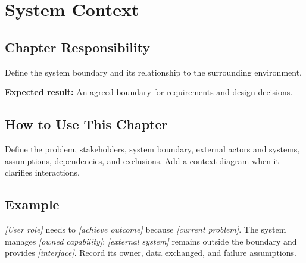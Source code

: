 \chapter{System Context}
\section{Chapter Responsibility}
\label{Section:SystemContextResponsibility}
Define the system boundary and its relationship to the surrounding environment.

\noindent\textbf{Expected result:} An agreed boundary for requirements and design decisions.

\section{How to Use This Chapter}
Define the problem, stakeholders, system boundary, external actors and systems, assumptions, dependencies, and exclusions. Add a context diagram when it clarifies interactions.
\section{Example}
\textit{[User role]} needs to \textit{[achieve outcome]} because \textit{[current problem]}. The system manages \textit{[owned capability]}; \textit{[external system]} remains outside the boundary and provides \textit{[interface]}. Record its owner, data exchanged, and failure assumptions.
